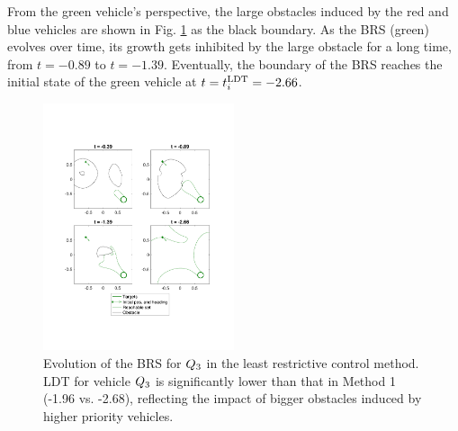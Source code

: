 From the green vehicle's perspective, the large obstacles induced by the red and blue vehicles are shown in Fig. \ref{fig:lrc_rs3} as the black boundary. As the BRS (green) evolves over time, its growth gets inhibited by the large obstacle for a long time, from $t=-0.89$ to $t=-1.39$. Eventually, the boundary of the BRS reaches the initial state of the green vehicle at $t = t^\text{LDT}_i = -2.66$.

\begin{figure}[h]
  \centering
  \includegraphics[width=0.5\textwidth]{"fig/lrc_rs3"}
  \caption{Evolution of the BRS for $Q_3$ in the least restrictive control method. LDT for vehicle $Q_3$ is significantly lower than that in Method 1 (-1.96 vs. -2.68), reflecting the impact of bigger obstacles induced by higher priority vehicles. }
  \label{fig:lrc_rs3}
\end{figure}
